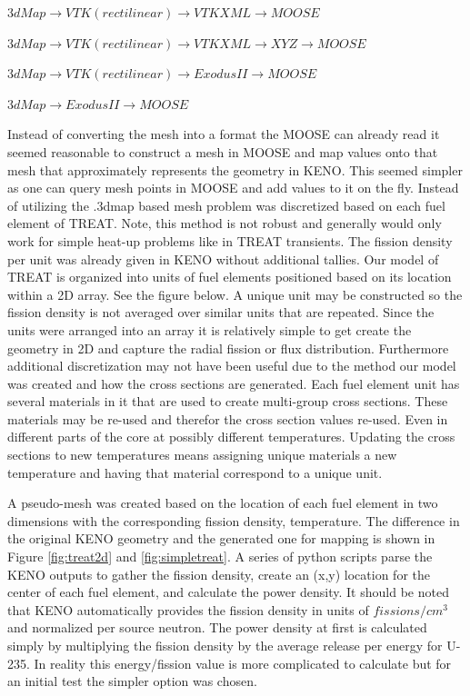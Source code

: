 \documentclass[11pt]{article}
\begin{document}
$3dMap \rightarrow VTK (rectilinear) \rightarrow VTK XML \rightarrow MOOSE$

$3dMap \rightarrow VTK (rectilinear) \rightarrow VTK XML \rightarrow XYZ \rightarrow MOOSE$

$3dMap \rightarrow VTK (rectilinear) \rightarrow Exodus II\rightarrow MOOSE$

$3dMap \rightarrow Exodus II \rightarrow MOOSE$

Instead of converting the mesh into a format the MOOSE can already read it seemed reasonable to construct a mesh in MOOSE and map values onto that mesh that approximately represents the geometry in KENO.  This seemed simpler as one can query mesh points in MOOSE and add values to it on the fly.  Instead of utilizing the .3dmap based mesh problem was discretized based on each fuel element of TREAT.  Note, this method is not robust and generally would only work for simple heat-up problems like in TREAT transients.  The fission density per unit was already given in KENO without additional tallies.  Our model of TREAT is organized into units of fuel elements positioned based on its location within a 2D array. See the figure below.  A unique unit may be constructed so the fission density is not averaged over similar units that are repeated.  Since the units were arranged into an array it is relatively simple to get create the geometry in 2D and capture the radial fission or flux distribution.  Furthermore additional discretization may not have been useful due to the method our model was created and how the cross sections are generated.  Each fuel element unit has several materials in it that are used to create multi-group cross sections. These materials may be re-used and therefor the cross section values re-used.  Even in different parts of the core at possibly different temperatures.  Updating the cross sections to new temperatures means assigning unique materials a new temperature and having that material correspond to a unique unit.  

A pseudo-mesh was created based on the location of each fuel element in two dimensions with the corresponding fission density, temperature.  The difference in the original KENO geometry and the generated one for mapping is shown in Figure \ref{fig:treat2d} and \ref{fig:simpletreat}.  A series of python scripts parse the KENO outputs to gather the fission density, create an (x,y) location for the center of each fuel element, and calculate the power density. It should be noted that KENO automatically provides the fission density in units of $fissions/cm^3$ and normalized per source neutron. The power density at first is calculated simply by multiplying the fission density by the average release per energy for U-235.  In reality this energy/fission value is more complicated to calculate but for an initial test the simpler option was chosen. 
\end{document}
